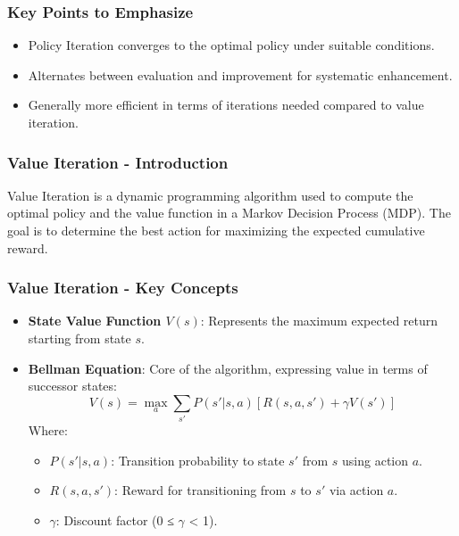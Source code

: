 \documentclass[aspectratio=169]{beamer}
\begin{document}
\begin{frame}[fragile]
    \frametitle{Key Points to Emphasize}
    \begin{itemize}
        \item Policy Iteration converges to the optimal policy under suitable conditions.
        \item Alternates between evaluation and improvement for systematic enhancement.
        \item Generally more efficient in terms of iterations needed compared to value iteration.
    \end{itemize}
\end{frame}

\begin{frame}[fragile]
    \frametitle{Value Iteration - Introduction}
    Value Iteration is a dynamic programming algorithm used to compute the optimal policy and the value function in a Markov Decision Process (MDP). The goal is to determine the best action for maximizing the expected cumulative reward.
\end{frame}

\begin{frame}[fragile]
    \frametitle{Value Iteration - Key Concepts}
    \begin{itemize}
        \item \textbf{State Value Function \(V(s)\)}: Represents the maximum expected return starting from state \(s\).
        \item \textbf{Bellman Equation}: Core of the algorithm, expressing value in terms of successor states:
        \begin{equation}
            V(s) = \max_a \sum_{s'} P(s'|s,a) \left[ R(s, a, s') + \gamma V(s') \right]
        \end{equation}
        Where:
        \begin{itemize}
            \item \(P(s'|s,a)\): Transition probability to state \(s'\) from \(s\) using action \(a\).
            \item \(R(s, a, s')\): Reward for transitioning from \(s\) to \(s'\) via action \(a\).
            \item \(\gamma\): Discount factor (0 ≤ \(\gamma\) < 1).
        \end{itemize}
    \end{itemize}
\end{frame}
\end{document}
